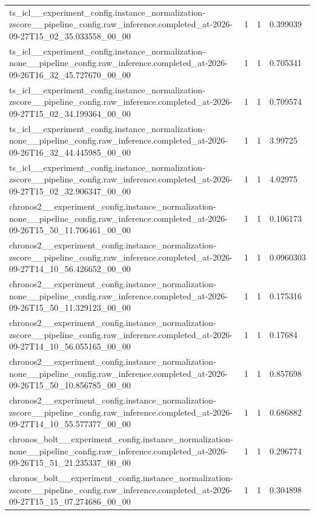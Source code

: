 \begin{tabular}{llll}
ts\_icl\_\_experiment\_config.instance\_normalization-zscore\_\_pipeline\_config.raw\_inference.completed\_at-2026-09-27T15\_02\_35.033558\_00\_00 & 1 & 1 & 0.399039 \\
ts\_icl\_\_experiment\_config.instance\_normalization-none\_\_pipeline\_config.raw\_inference.completed\_at-2026-09-26T16\_32\_45.727670\_00\_00 & 1 & 1 & 0.705341 \\
ts\_icl\_\_experiment\_config.instance\_normalization-zscore\_\_pipeline\_config.raw\_inference.completed\_at-2026-09-27T15\_02\_34.199364\_00\_00 & 1 & 1 & 0.709574 \\
ts\_icl\_\_experiment\_config.instance\_normalization-none\_\_pipeline\_config.raw\_inference.completed\_at-2026-09-26T16\_32\_44.445985\_00\_00 & 1 & 1 & 3.99725 \\
ts\_icl\_\_experiment\_config.instance\_normalization-zscore\_\_pipeline\_config.raw\_inference.completed\_at-2026-09-27T15\_02\_32.906347\_00\_00 & 1 & 1 & 4.02975 \\
chronos2\_\_experiment\_config.instance\_normalization-none\_\_pipeline\_config.raw\_inference.completed\_at-2026-09-26T15\_50\_11.706461\_00\_00 & 1 & 1 & 0.106173 \\
chronos2\_\_experiment\_config.instance\_normalization-zscore\_\_pipeline\_config.raw\_inference.completed\_at-2026-09-27T14\_10\_56.426652\_00\_00 & 1 & 1 & 0.0960303 \\
chronos2\_\_experiment\_config.instance\_normalization-none\_\_pipeline\_config.raw\_inference.completed\_at-2026-09-26T15\_50\_11.329123\_00\_00 & 1 & 1 & 0.175316 \\
chronos2\_\_experiment\_config.instance\_normalization-zscore\_\_pipeline\_config.raw\_inference.completed\_at-2026-09-27T14\_10\_56.055165\_00\_00 & 1 & 1 & 0.17684 \\
chronos2\_\_experiment\_config.instance\_normalization-none\_\_pipeline\_config.raw\_inference.completed\_at-2026-09-26T15\_50\_10.856785\_00\_00 & 1 & 1 & 0.857698 \\
chronos2\_\_experiment\_config.instance\_normalization-zscore\_\_pipeline\_config.raw\_inference.completed\_at-2026-09-27T14\_10\_55.577377\_00\_00 & 1 & 1 & 0.686882 \\
chronos\_bolt\_\_experiment\_config.instance\_normalization-none\_\_pipeline\_config.raw\_inference.completed\_at-2026-09-26T15\_51\_21.235337\_00\_00 & 1 & 1 & 0.296774 \\
chronos\_bolt\_\_experiment\_config.instance\_normalization-zscore\_\_pipeline\_config.raw\_inference.completed\_at-2026-09-27T15\_15\_07.274686\_00\_00 & 1 & 1 & 0.304898 \\

\end{tabular}
